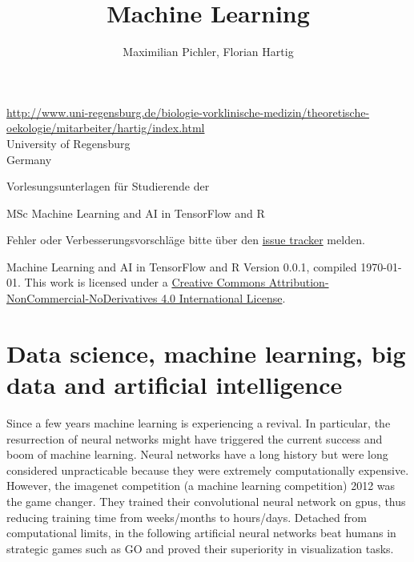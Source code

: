 \documentclass[a4paper,twoside]{tufte-book}\usepackage[]{graphicx}\usepackage[]{color}
\title{Machine Learning}
\author{Maximilian Pichler, Florian Hartig}
\begin{document}

\let\cleardoublepage\clearpage %
\maketitle


\thispagestyle{empty}
\null


\href{Prof. Dr. Florian Hartig}{http://www.uni-regensburg.de/biologie-vorklinische-medizin/theoretische-oekologie/mitarbeiter/hartig/index.html}\\
University of Regensburg\\
Germany\\[0.5cm]

\begin{fullwidth}
Vorlesungsunterlagen für Studierende der

\begin{itemize*}
  \item MSc Machine Learning and AI in TensorFlow and R
\end{itemize*}

\vspace{0.5cm}

Fehler oder Verbesserungsvorschläge bitte über den \href{https://github.com/TheoreticalEcology/machinelearning/issues}{issue tracker} melden. 

\end{fullwidth}


\vfill
\begin{fullwidth}
Machine Learning and AI in TensorFlow and R Version 0.0.1, compiled \today.
%
%
This work is licensed under a \href{https://creativecommons.org/licenses/by-nc-nd/4.0/}{Creative Commons Attribution-NonCommercial-NoDerivatives 4.0 International License}. 
\end{fullwidth}


\newpage
\tableofcontents

\chapter{Data science, machine learning, big data and artificial intelligence}
Since a few years machine learning is experiencing a revival. In particular, the resurrection of neural networks might have triggered the current success and boom of machine learning. Neural networks have a long history but were long considered unpracticable because they were extremely computationally expensive. However, the imagenet competition (a machine learning competition) 2012 was the game changer. They trained their convolutional neural network on gpus, thus reducing training time from weeks/months to hours/days. Detached from computational limits, in the following artificial neural networks beat humans in strategic games such as GO and proved their superiority in visualization tasks.
\end{document}

